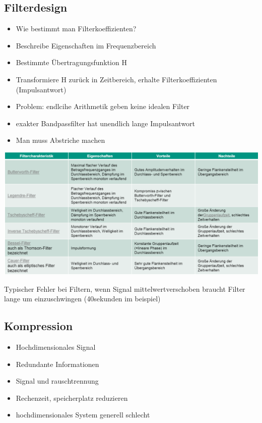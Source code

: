 \documentclass[a4paper,10pt,oneside]{article}
\begin{document}
\subsection{Filterdesign}
\begin{itemize}
	\item Wie bestimmt man Filterkoeffizienten?
	\item Beschreibe Eigenschaften im Frequenzbereich
	\item Bestimmte Übertragungsfunktion H
	\item Transformiere H zurück in Zeitbereich, erhalte Filterkoeffizienten (Impulsantwort)
	\item Problem: endlcihe Arithmetik geben keine idealen Filter
	\item exakter Bandpassfilter hat unendlich lange Impulsantwort
	\item Man muss Abstriche machen
\end{itemize}

\includegraphics[scale=0.65]{Grafiken/tabelle.png}

Typischer Fehler bei Filtern, wenn Signal mittelwertverschoben braucht Filter lange um einzuschwingen (40sekunden im beispiel)

\subsection{Kompression}
\begin{itemize}
	\item Hochdimensionales Signal
	\item Redundante Informationen
	\item Signal und rauschtrennung
	\item Rechenzeit, speicherplatz reduzieren
	\item hochdimensionales System generell schlecht
\end{itemize}
\end{document}
